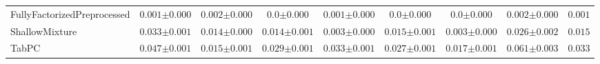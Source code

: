\begin{tabular}{lccccccc|c}
    FullyFactorizedPreprocessed & $0.001${\tiny${\pm 0.000}$} & $0.002${\tiny${\pm 0.000}$} & $0.0${\tiny${\pm 0.000}$} & $0.001${\tiny${\pm 0.000}$} & $0.0${\tiny${\pm 0.000}$} & $0.0${\tiny${\pm 0.000}$} & $0.002${\tiny${\pm 0.000}$} & $0.001$ \\
    ShallowMixture & $0.033${\tiny${\pm 0.001}$} & $0.014${\tiny${\pm 0.000}$} & $0.014${\tiny${\pm 0.001}$} & $0.003${\tiny${\pm 0.000}$} & $0.015${\tiny${\pm 0.001}$} & $0.003${\tiny${\pm 0.000}$} & $0.026${\tiny${\pm 0.002}$} & $0.015$ \\
    TabPC & $0.047${\tiny${\pm 0.001}$} & $0.015${\tiny${\pm 0.001}$} & $0.029${\tiny${\pm 0.001}$} & $0.033${\tiny${\pm 0.001}$} & $0.027${\tiny${\pm 0.001}$} & $0.017${\tiny${\pm 0.001}$} & $0.061${\tiny${\pm 0.003}$} & $0.033$ \\
    \bottomrule[1.0pt]
\end{tabular}